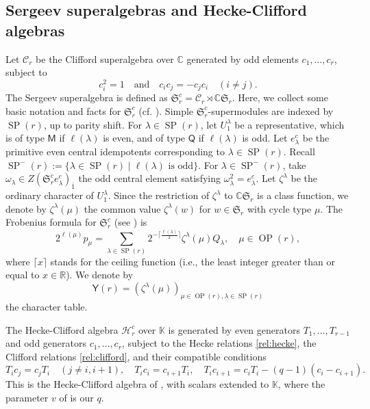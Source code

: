\documentclass[11pt]{amsart}
\numberwithin{equation}{section}
\theoremstyle{plain}
\theoremstyle{definition}
\theoremstyle{remark}
\begin{document}
\subsection{Sergeev superalgebras and Hecke-Clifford algebras}
Let $\mathcal C_r$ be the Clifford superalgebra over $\mathbb{C}$ generated by odd
elements $c_1,\ldots,c_r$, subject to
\begin{equation}\label{rel:clifford}
c_i^2=1 \quad\text{and}\quad c_ic_j=-c_jc_i\quad (i\neq j).
\end{equation}
The Sergeev superalgebra is defined as
$\mathfrak S_r^c=\mathcal C_r\rtimes\mathbb C\mathfrak S_r$. Here, we collect some basic notation and facts for $\mathfrak S_r^c$ (cf. \cite[\S2.2]{WW13}). Simple $\mathfrak S_r^c$-supermodules are indexed by $\operatorname{SP}(r)$, up to parity shift.
For $\lambda\in\operatorname{SP}(r)$, let $U_1^\lambda$ be a
representative, which is of type
$\mathsf{M}$ if $\ell(\lambda)$ is even, and of type $\mathsf{Q}$ if
$\ell(\lambda)$ is odd. Let $e_\lambda^c$ be the primitive even
central idempotents corresponding to $\lambda\in\operatorname{SP}(r)$. 
Recall $\operatorname{SP}^{-}(r):=\{\lambda\in\operatorname{SP}(r)\mid
\ell(\lambda)\text{ is odd}\}$.
For $\lambda\in\operatorname{SP}^{-}(r)$, take
$\omega_\lambda\in Z(\mathfrak S_r^c e_\lambda^c)_{\bar1}$
the odd central element satisfying $\omega_\lambda^2=e_\lambda^c$.
%
Let $\zeta^\lambda$ be the ordinary character of $U_1^\lambda$. Since the restriction of
$\zeta^\lambda$ to $\mathbb C\mathfrak S_r$ is a class function, we denote by $\zeta^\lambda(\mu)$ the common value $\zeta^\lambda(w)$ for $w\in\mathfrak{S}_r$ with cycle type $\mu$.
The Frobenius formula for $\mathfrak S_r^c$ (see \cite[Theorem~3.7 and Remark~3.8]{WW13}) is
\begin{equation}\label{eq:spin-frob}
2^{\ell(\mu)}p_\mu
=\sum_{\lambda\in\operatorname{SP}(r)}
  2^{-\lceil\frac{\ell(\lambda)}{2}\rceil}
  \zeta^\lambda(\mu)Q_\lambda,
\quad
\mu\in\operatorname{OP}(r),
\end{equation}
where $\lceil x\rceil$ stands for the ceiling function (i.e., the least integer greater than or equal to $x\in\mathbb{R}$).
We denote by 
\begin{equation}\label{def:Yr}
\mathsf{Y}(r)=(\zeta^\lambda(\mu))_{ \mu\in\operatorname{OP}(r), \lambda\in\operatorname{SP}(r)}
\end{equation}
the character table.


The Hecke-Clifford algebra $\mathcal H_r^c$ over $\mathbb{K}$
is generated by even generators $T_1,\ldots,T_{r-1}$ and odd generators
$c_1,\ldots,c_r$, subject to
the Hecke relations \eqref{rel:hecke}, the Clifford relations \eqref{rel:clifford}, and their compatible conditions
$$
T_ic_j=c_jT_i \quad(j\neq i,i+1),\quad
T_ic_i=c_{i+1}T_i, \quad
T_ic_{i+1}=c_iT_i-(q-1)(c_i-c_{i+1}).
$$
This is the Hecke-Clifford algebra of \cite[\S2.3]{WW13}, with scalars
extended to $\mathbb K$, where the parameter $v$ of \cite{WW13} is our $q$.
\end{document}
